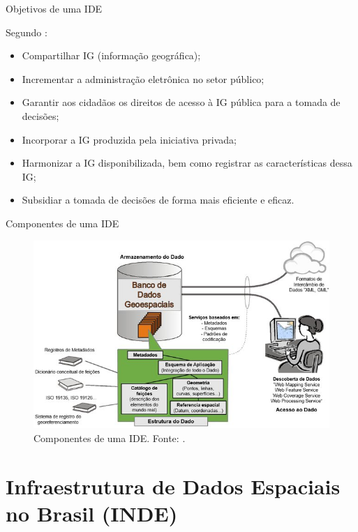 \documentclass[9pt,ignorenonframetext,]{beamer}
\providecommand{\tightlist}{%
  \setlength{\itemsep}{0pt}\setlength{\parskip}{0pt}}
\begin{document}
\begin{frame}{Objetivos de uma IDE}
\protect\hypertarget{objetivos-de-uma-ide}{}

Segundo \textcite{INDE}:

\begin{itemize}[<+->]
\tightlist
\item
  Compartilhar IG (informação geográfica);
\item
  Incrementar a administração eletrônica no setor público;
\item
  Garantir aos cidadãos os direitos de acesso à IG pública para a tomada
  de decisões;
\item
  Incorporar a IG produzida pela iniciativa privada;
\item
  Harmonizar a IG disponibilizada, bem como registrar as características
  dessa IG;
\item
  Subsidiar a tomada de decisões de forma mais eficiente e eficaz.
\end{itemize}

\end{frame}

\begin{frame}{Componentes de uma IDE}
\protect\hypertarget{componentes-de-uma-ide}{}

\begin{figure}[H]

{\centering \includegraphics[width=0.7\linewidth]{images/Figura-2-Componentes-principais-de-uma-IDE_W640} 

}

\caption{Componentes de uma IDE. Fonte: \textcite{IDEM}.}\label{fig:unnamed-chunk-1}
\end{figure}

\end{frame}

\hypertarget{infraestrutura-de-dados-espaciais-no-brasil-inde}{%
\section{Infraestrutura de Dados Espaciais no Brasil
(INDE)}\label{infraestrutura-de-dados-espaciais-no-brasil-inde}}
\end{document}
